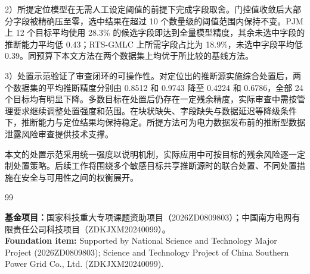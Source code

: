 \documentclass[UTF8,zihao=5,twoside,fontset=none]{ctexart}
\newcommand{\rev}[1]{{\color{blue}#1}}
\begin{document}
2）所提定位模型在无需人工设定阈值的前提下完成字段取舍。门控值收敛后大部分字段被精确压至零，选中结果在超过 10 个数量级的阈值范围内保持不变。PJM 上 12 个目标平均使用 28.3\% 的候选字段即达到全量模型精度，其余未选中字段的推断能力平均低 0.43；RTS-GMLC 上所需字段占比为 18.9\%，未选中字段平均低 0.39。同预算下本文方法在两个数据集上均优于所比较的基线方法。

3）处置示范验证了\rev{审查}闭环的可操作性。对定位出的推断源实施综合处置后，两个数据集的平均推断精度分别由 0.8512 和 0.9743 降至 0.4224 和 0.6786，全部 24 个目标均有明显下降。多数目标在处置后仍存在一定残余精度，实际审查中需按管理要求继续调整处置强度和范围。在块状缺失、字段缺失与数据延迟等降级条件下，推断能力与定位结果均保持稳定。\rev{所提方法可为电力数据发布前的推断型数据泄露风险审查提供技术支撑。}

本文的处置示范采用统一强度以说明机制，实际应用中可按目标的残余风险逐一定制处置策略。后续工作将围绕多个敏感目标共享推断源时的联合处置、不同处置措施在安全与可用性之间的权衡展开。

\balance
\begin{thebibliography}{99}
\setlength{\itemsep}{0.15ex}\setlength{\parskip}{0pt}

\end{thebibliography}

\vspace{0.6em}
\noindent\begin{minipage}{\columnwidth}
{\textbf{基金项目：}国家科技重大专项课题资助项目（2026ZD0809803）；中国南方电网有限责任公司科技项目（ZDKJXM20240099）。\\
\textbf{Foundation item:} Supported by National Science and Technology Major Project (2026ZD0809803); Science and Technology Project of China Southern Power Grid Co., Ltd. (ZDKJXM20240099).}
\end{minipage}

\vspace{0.6em}
\end{document}
